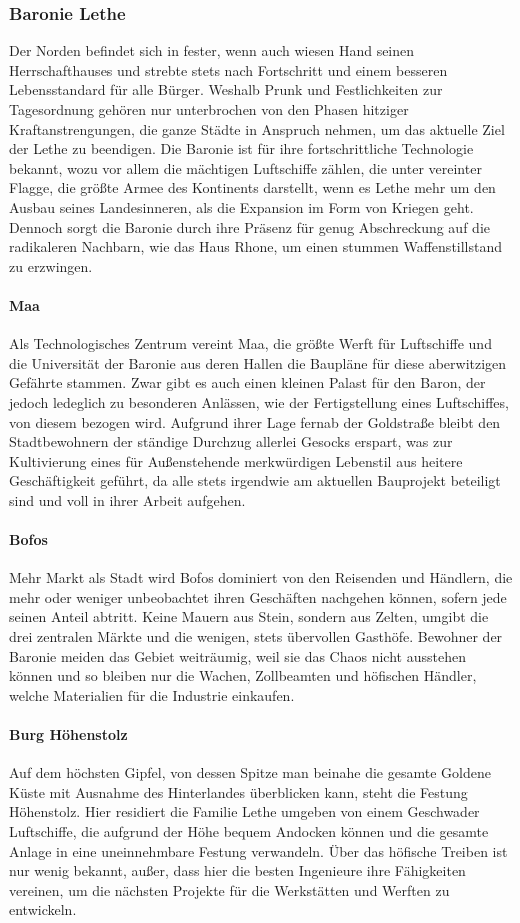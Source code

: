 \documentclass[a4paper,12pt,oneside]{book}
\begin{document}
\subsubsection{Baronie Lethe}
Der Norden befindet sich in fester, wenn auch wiesen Hand seinen Herrschafthauses und strebte stets nach Fortschritt und einem besseren Lebensstandard für alle Bürger. Weshalb Prunk und Festlichkeiten zur Tagesordnung gehören nur unterbrochen von den Phasen hitziger Kraftanstrengungen, die ganze Städte in Anspruch nehmen, um das aktuelle Ziel der Lethe zu beendigen. Die Baronie ist für ihre fortschrittliche Technologie bekannt, wozu vor allem die mächtigen Luftschiffe zählen, die unter vereinter Flagge, die größte Armee des Kontinents darstellt, wenn es Lethe mehr um den Ausbau seines Landesinneren, als die Expansion im Form von Kriegen geht. Dennoch sorgt die Baronie durch ihre Präsenz für genug Abschreckung auf die radikaleren Nachbarn, wie das Haus Rhone, um einen stummen Waffenstillstand zu erzwingen.
\paragraph{Maa}
Als Technologisches Zentrum vereint Maa, die größte Werft für Luftschiffe und die Universität der Baronie aus deren Hallen die Baupläne für diese aberwitzigen Gefährte stammen. Zwar gibt es auch einen kleinen Palast für den Baron, der jedoch ledeglich zu besonderen Anlässen, wie der Fertigstellung eines Luftschiffes, von diesem bezogen wird. Aufgrund ihrer Lage fernab der Goldstraße bleibt den Stadtbewohnern der ständige Durchzug allerlei Gesocks erspart, was zur Kultivierung eines für Außenstehende merkwürdigen Lebenstil aus heitere Geschäftigkeit geführt, da alle stets irgendwie am aktuellen Bauprojekt beteiligt sind und voll in ihrer Arbeit aufgehen.
\paragraph{Bofos}
Mehr Markt als Stadt wird Bofos dominiert von den Reisenden und Händlern, die mehr oder weniger unbeobachtet ihren Geschäften nachgehen können, sofern jede seinen Anteil abtritt. Keine Mauern aus Stein, sondern aus Zelten, umgibt die drei zentralen Märkte und die wenigen, stets übervollen Gasthöfe. Bewohner der Baronie meiden das Gebiet weiträumig, weil sie das Chaos nicht ausstehen können und so bleiben nur die Wachen, Zollbeamten und höfischen Händler, welche Materialien für die Industrie einkaufen.
\paragraph{Burg Höhenstolz}
Auf dem höchsten Gipfel, von dessen Spitze man beinahe die gesamte Goldene Küste mit Ausnahme des Hinterlandes überblicken kann, steht die Festung Höhenstolz. Hier residiert die Familie Lethe umgeben von einem Geschwader Luftschiffe, die aufgrund der Höhe bequem Andocken können und die gesamte Anlage in eine uneinnehmbare Festung verwandeln. Über das höfische Treiben ist nur wenig bekannt, außer, dass hier die besten Ingenieure ihre Fähigkeiten vereinen, um die nächsten Projekte für die Werkstätten und Werften zu entwickeln.
\end{document}
